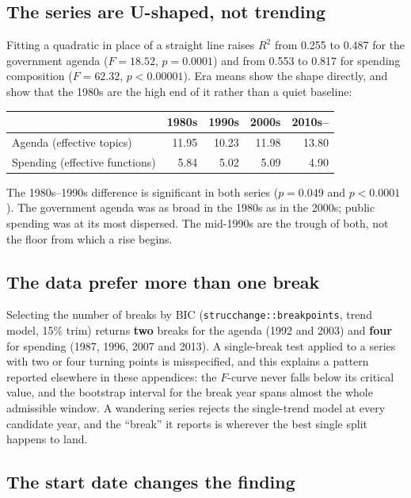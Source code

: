 \subsection*{The series are U-shaped, not trending}

Fitting a quadratic in place of a straight line raises $R^2$ from 0.255 to 0.487 for the government
agenda ($F=18.52$, $p=0.0001$) and from 0.553 to 0.817 for spending composition ($F=62.32$,
$p<0.00001$). Era means show the shape directly, and show that the 1980s are the high end of it
rather than a quiet baseline:

\begin{center}
\begin{tabular}{lrrrr}
\toprule
& 1980s & 1990s & 2000s & 2010s-- \\
\midrule
Agenda (effective topics) & 11.95 & 10.23 & 11.98 & 13.80 \\
Spending (effective functions) & 5.84 & 5.02 & 5.09 & 4.90 \\
\bottomrule
\end{tabular}
\end{center}

The 1980s--1990s difference is significant in both series ($p=0.049$ and $p<0.0001$). The
government agenda was as broad in the 1980s as in the 2000s; public spending was at its most
dispersed. The mid-1990s are the trough of both, not the floor from which a rise begins.

\subsection*{The data prefer more than one break}

Selecting the number of breaks by BIC (\texttt{strucchange::breakpoints}, trend model, 15\% trim)
returns \textbf{two} breaks for the agenda (1992 and 2003) and \textbf{four} for spending (1987,
1996, 2007 and 2013). A single-break test applied to a series with two or four turning points is
misspecified, and this explains a pattern reported elsewhere in these appendices: the $F$-curve
never falls below its critical value, and the bootstrap interval for the break year spans almost the
whole admissible window. A wandering series rejects the single-trend model at every candidate year,
and the ``break'' it reports is wherever the best single split happens to land.

\subsection*{The start date changes the finding}

